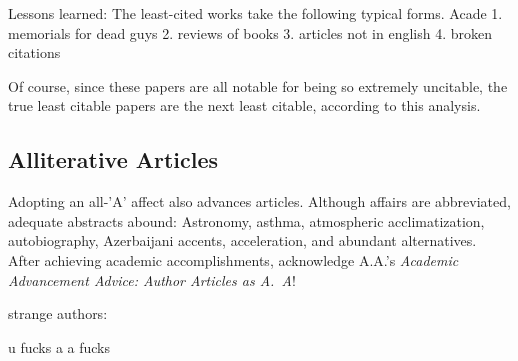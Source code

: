 \documentclass[twocolumn]{article}
\begin{document}

Lessons learned:
The least-cited works take the following typical forms. Acade
1. memorials for dead guys
2. reviews of books
3. articles not in english
4. broken citations

\medskip
Of course, since these papers are all notable for being so extremely
uncitable, the true least citable papers are the next least citable,
according to this analysis.


\subsection{Alliterative Articles}

Adopting an all-'A' affect also advances articles. Although affairs
are abbreviated, adequate abstracts abound: Astronomy, asthma,
atmospheric acclimatization, autobiography, Azerbaijani accents,
acceleration, and abundant alternatives. After achieving academic
accomplishments, acknowledge A.A.'s {\it Academic Advancement Advice:
  Author Articles as A.~A}!


strange authors:

u fucks
a a fucks
\end{document}
